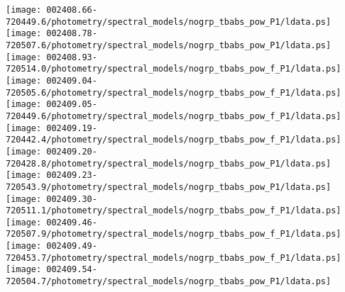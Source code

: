 \documentclass{aastex}
\begin{document}
\begin{figure*}[!ht]
\centering
\texttt{[image: 002408.66-720449.6/photometry/spectral\_models/nogrp\_tbabs\_pow\_P1/ldata.ps]} \hfill 
\texttt{[image: 002408.78-720507.6/photometry/spectral\_models/nogrp\_tbabs\_pow\_P1/ldata.ps]} \hfill 
\texttt{[image: 002408.93-720514.0/photometry/spectral\_models/nogrp\_tbabs\_pow\_f\_P1/ldata.ps]} \\ 
\vspace*{0.5in}
\texttt{[image: 002409.04-720505.6/photometry/spectral\_models/nogrp\_tbabs\_pow\_f\_P1/ldata.ps]} \hfill 
\texttt{[image: 002409.05-720449.6/photometry/spectral\_models/nogrp\_tbabs\_pow\_f\_P1/ldata.ps]} \hfill 
\texttt{[image: 002409.19-720442.4/photometry/spectral\_models/nogrp\_tbabs\_pow\_f\_P1/ldata.ps]} \\ 
\vspace*{0.5in}
\texttt{[image: 002409.20-720428.8/photometry/spectral\_models/nogrp\_tbabs\_pow\_P1/ldata.ps]} \hfill 
\texttt{[image: 002409.23-720543.9/photometry/spectral\_models/nogrp\_tbabs\_pow\_P1/ldata.ps]} \hfill 
\texttt{[image: 002409.30-720511.1/photometry/spectral\_models/nogrp\_tbabs\_pow\_f\_P1/ldata.ps]} \\ 
\vspace*{0.5in}
\texttt{[image: 002409.46-720507.9/photometry/spectral\_models/nogrp\_tbabs\_pow\_f\_P1/ldata.ps]} \hfill 
\texttt{[image: 002409.49-720453.7/photometry/spectral\_models/nogrp\_tbabs\_pow\_f\_P1/ldata.ps]} \hfill 
\texttt{[image: 002409.54-720504.7/photometry/spectral\_models/nogrp\_tbabs\_pow\_P1/ldata.ps]} \\ 
\vspace*{0.5in}
\end{figure*}
\clearpage
\end{document}
